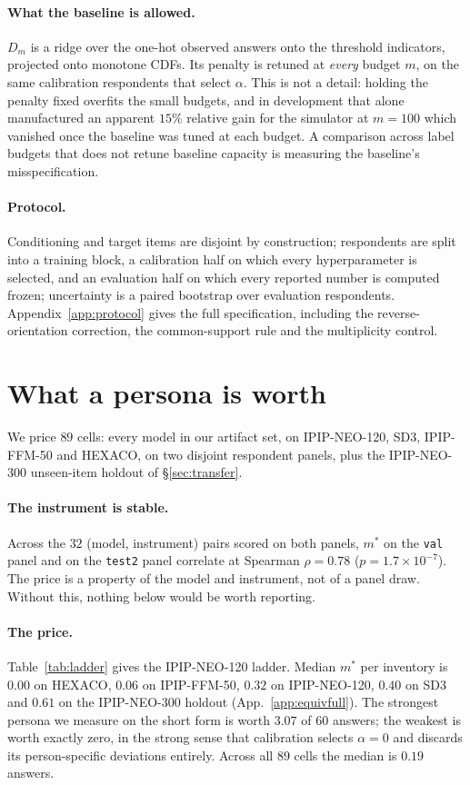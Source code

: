 \paragraph{What the baseline is allowed.} $D_m$ is a ridge over the one-hot
observed answers onto the threshold indicators, projected onto monotone CDFs.
Its penalty is retuned at \emph{every} budget $m$, on the same calibration
respondents that select $\alpha$. This is not a detail: holding the penalty fixed
overfits the small budgets, and in development that alone manufactured an
apparent $15\%$ relative gain for the simulator at $m{=}100$ which vanished once
the baseline was tuned at each budget. A comparison across label budgets that
does not retune baseline capacity is measuring the baseline's misspecification.

\paragraph{Protocol.} Conditioning and target items are disjoint by
construction; respondents are split into a training block, a calibration half on
which every hyperparameter is selected, and an evaluation half on which every
reported number is computed frozen; uncertainty is a paired bootstrap over
evaluation respondents. Appendix~\ref{app:protocol} gives the full specification,
including the reverse-orientation correction, the common-support rule and the
multiplicity control.

\section{What a persona is worth}
\label{sec:price}

We price $89$ cells: every model in our artifact set, on IPIP-NEO-120, SD3,
IPIP-FFM-50 and HEXACO, on two disjoint respondent panels, plus the IPIP-NEO-300
unseen-item holdout of \S\ref{sec:transfer}.

\paragraph{The instrument is stable.} Across the $32$ (model, instrument) pairs
scored on both panels, $m^{*}$ on the \texttt{val} panel and on the \texttt{test2}
panel correlate at Spearman $\rho{=}0.78$ ($p{=}1.7\times10^{-7}$). The price is a
property of the model and instrument, not of a panel draw. Without this, nothing
below would be worth reporting.

\paragraph{The price.} Table~\ref{tab:ladder} gives the IPIP-NEO-120 ladder.
Median $m^{*}$ per inventory is $0.00$ on HEXACO, $0.06$ on IPIP-FFM-50, $0.32$
on IPIP-NEO-120, $0.40$ on SD3 and $0.61$ on the IPIP-NEO-300 holdout
(App.~\ref{app:equivfull}). The strongest persona we
measure on the short form is worth $3.07$ of $60$ answers; the weakest is worth
exactly zero, in the strong sense that calibration selects $\alpha{=}0$ and
discards its person-specific deviations entirely. Across all $89$ cells the median
is $0.19$ answers.

